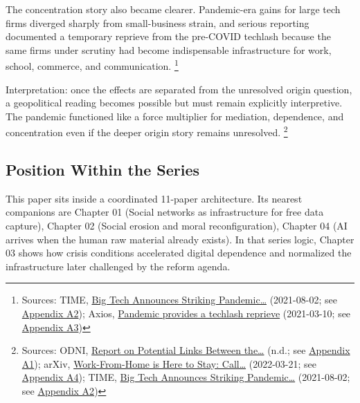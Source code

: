 \documentclass[
  american,
  11pt,
  letterpaper,
]{article}
\begin{document}
The concentration story also became clearer. Pandemic-era gains for
large tech firms diverged sharply from small-business strain, and
serious reporting documented a temporary reprieve from the pre-COVID
techlash because the same firms under scrutiny had become indispensable
infrastructure for work, school, commerce, and communication.
\footnote{Sources: TIME,
  \href{https://time.com/6085674/big-tech-apple-microsoft-facebook-amazon-google-earnings/}{Big
  Tech Announces Striking Pandemic\ldots{}} (2021-08-02; see
  \hyperref[appendix-a2-big-tech-announces-striking-pandemic-gains-as-small-businesses-strain-to-find-their-footing]{Appendix
  A2}); Axios,
  \href{https://www.axios.com/2021/03/10/pandemic-provides-techlash-reprieve}{Pandemic
  provides a techlash reprieve} (2021-03-10; see
  \hyperref[appendix-a3-pandemic-provides-a-techlash-reprieve]{Appendix
  A3})}

Interpretation: once the effects are separated from the unresolved
origin question, a geopolitical reading becomes possible but must remain
explicitly interpretive. The pandemic functioned like a force multiplier
for mediation, dependence, and concentration even if the deeper origin
story remains unresolved. \footnote{Sources: ODNI,
  \href{https://www.dni.gov/files/ODNI/documents/assessments/Report-on-Potential-Links-Between-the-Wuhan-Institute-of-Virology-and-the-Origins-of-COVID-19-20230623.pdf}{Report
  on Potential Links Between the\ldots{}} (n.d.; see
  \hyperref[appendix-a1-report-on-potential-links-between-the-wuhan-institute-of-virology-and-the-origins-of-covid-19]{Appendix
  A1}); arXiv, \href{https://arxiv.org/abs/2203.11136}{Work-From-Home is
  Here to Stay: Call\ldots{}} (2022-03-21; see
  \hyperref[appendix-a4-work-from-home-is-here-to-stay-call-for-flexibility-in-post-pandemic-work-policies]{Appendix
  A4}); TIME,
  \href{https://time.com/6085674/big-tech-apple-microsoft-facebook-amazon-google-earnings/}{Big
  Tech Announces Striking Pandemic\ldots{}} (2021-08-02; see
  \hyperref[appendix-a2-big-tech-announces-striking-pandemic-gains-as-small-businesses-strain-to-find-their-footing]{Appendix
  A2})}

\subsection{Position Within the
Series}\label{position-within-the-series}

This paper sits inside a coordinated 11-paper architecture. Its nearest
companions are Chapter 01 (Social networks as infrastructure for free
data capture), Chapter 02 (Social erosion and moral reconfiguration),
Chapter 04 (AI arrives when the human raw material already exists). In
that series logic, Chapter 03 shows how crisis conditions accelerated
digital dependence and normalized the infrastructure later challenged by
the reform agenda.
\end{document}
